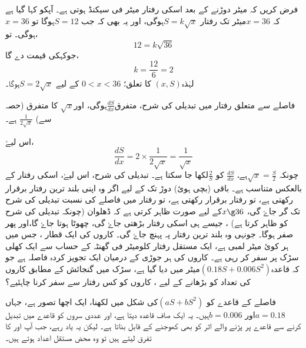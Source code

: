 فرض کریں کہ  میٹر دوڑنے کے بعد اسکی رفتار میٹر فی سیکنڈ ہوتی ہے۔ آپکو کہا گیا ہے کہ $x=36 $میٹر تک رفتار  $S=k\sqrt{x} $ہوگی، اور یہ بھی کہ جب  $S=12$ہوگا تو  $x=36$ ہوگی۔ تو،
\[12=k\sqrt{36}\]
جوکہکی قیمت دے گا،
\[ k=\frac{12}{6}=2\]
لہٰذہ\(   (x,S)    \)  کا تعلق؛
\(   0<x<36 \)
 کے لیے \( S=2\sqrt{x}  \)ہوگا۔

فاصلے سے متعلق رفتار میں تبدیلی کی شرح، متفرق$\frac{dS}{dx}$ہوگی، اور$\sqrt{x}$ کا متفرق (حصہ   سے)   $\frac{1}{2\sqrt{x}}$ ہے۔ 
  
اس لیۓ،
$$ \frac{dS}{dx}=2 \times \frac{1}{2\sqrt{x}}=\frac{1}{\sqrt{x}} $$
چونکہ  \(   \sqrt{x}=\frac{S}{2}    \)ہے، \(   \frac{dS}{dx}    \) کو \(\frac{2}{S}\)لکھا جا سکتا ہے۔ تبدیلی کی شرح، اس لیۓ، اسکی رفتار کے بالعکس متناسب ہے۔
باقی (بچی ہوئ) دوڑ تک کے لیے اگر وہ اپنی بلند ترین رفتار برقرار رکھتی ہے، تو رفتار برقرار رکھتی ہے، تو رفتار میں فاصلے کی نسبت تبدیلی کی شرح   تک گر جاۓ گی،    \(   x\g 36    \)کے لیے صورت   ظاہر کرتی ہے کہ ڈھلوان (چونکہ تبدیلی کی شرح کو ظاہر کرتا ہے) ، جیسے ہی اسکی رفتار بڑھتی جاۓ گی، چھوٹا ہوتا جاۓ گا،اور پھر صفر ہوگا۔ جونہی وہ بلند ترین رفتار پہ پہنچ جاۓ گی۔
%
کاروں کی ایک قطار ، جس میں ہر کوئ    میٹر لمبی ہے، ایک مستقل رفتار    کلومیٹر فی گھنٹہ کے حساب سے ایک کھلی سڑک پر سفر کر رہی ہے۔ کاروں کی ہر جوڑی کے درمیان ایک تجویز کردہ فاصلہ ہے جو کہ قاعدہ\( (0.18S+0.006S^2)\)میٹر میں دیا گیا ہے، سڑک میں گنجائش کے مطابق کاروں کی تعداد کو بڑھانے کے لیے ، کاروں کو کس رفتار سے سفر کرنا چاہئیے؟

فاصلے کے قاعدے  کو  \((aS+bS^2)\)کی شکل میں لکھنا، ایک اچھا تصور ہے، جہاں \(a=0.18 \)اور  \(b=0.006\)ہیں۔ یہ ایک صاف قاعدہ دیتا ہے، اور عددی سروں کو قاعدے میں تبدیل کرنے سے قاعدے پر پڑنے والے اثر کو بھی کھوجنے کے قابل بناتا ہے۔ لیکن یہ یاد رہے، جب آپ  اور  کا تفرق لیتے ہیں تو وہ محض مستقل اعداد ہوتے ہیں۔

